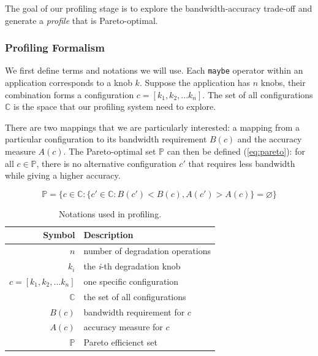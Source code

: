 The goal of our profiling stage is to explore the bandwidth-accuracy trade-off
and generate a \textit{profile} that is Pareto-optimal.

\subsubsection{Profiling Formalism}
\label{sec:formalize-profiling}

We first define terms and notations we will use. Each \texttt{maybe} operator
within an application corresponds to a knob $k$. Suppose the application has $n$
knobs, their combination forms a configuration $c = [k_{1}, k_{2},
... k_{n}]$. The set of all configurations $\mathbb{C}$ is the space that our
profiling system need to explore.

There are two mappings that we are particularly interested: a mapping from a
particular configuration to its bandwidth requirement $B(c)$ and the accuracy
measure $A(c)$. The Pareto-optimal set $\mathbb{P}$ can then be defined
(\autoref{eq:pareto}): for all $c \in \mathbb{P}$, there is no alternative
configuration $c'$ that requires less bandwidth while giving a higher accuracy.

{\small
\begin{equation}
  \mathbb{P} = \{ c \in \mathbb{C} : \{ c' \in \mathbb{C}: B(c') < B(c),
  A(c') > A(c) \} = \varnothing\}
  \label{eq:pareto}
\end{equation}
}%

\begin{table}
  \centering
  \begin{tabular}{r l}
    \toprule
    \textbf{Symbol} & \textbf{Description} \\
    \midrule
    $n$ & number of degradation operations \\
    $k_i$ & the \textit{i}-th degradation knob \\
    $c = [k_{1}, k_{2}, ... k_{n}]$ & one specific configuration \\
    $\mathbb{C}$ & the set of all configurations \\
    \midrule
    $B(c)$ & bandwidth requirement for $c$ \\
    $A(c)$ & accuracy measure for $c$ \\
    $\mathbb{P}$ & Pareto efficienct set \\
    \bottomrule
  \end{tabular}
  \caption{Notations used in profiling.}
  \label{tab:notations}
\end{table}

